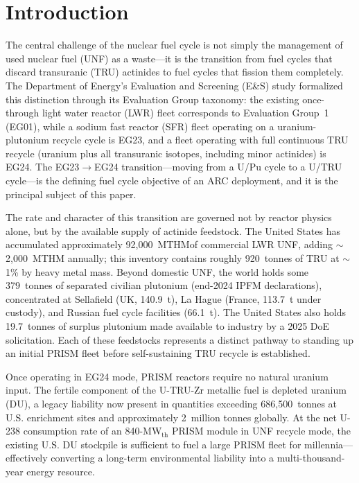 \documentclass[10pt,twoside]{article}
\begin{document}
\section{Introduction}

The central challenge of the nuclear fuel cycle is not simply the management
of used nuclear fuel (UNF) as a waste---it is the transition from fuel cycles that
discard transuranic (TRU) actinides to fuel cycles that fission them completely.
The Department of Energy's Evaluation and Screening (E\&S) study\cite{DOE_ES_2014}
formalized this distinction through its Evaluation Group taxonomy: the existing
once-through light water reactor (LWR) fleet corresponds to Evaluation Group~1
(EG01), while a sodium fast reactor (SFR) fleet operating on a uranium-plutonium
recycle cycle is EG23, and a fleet operating with full continuous TRU recycle
(uranium plus all transuranic isotopes, including minor actinides) is EG24.
The EG23$\rightarrow$EG24 transition---moving from a U/Pu cycle to a U/TRU
cycle---is the defining fuel cycle objective of an ARC deployment, and it is the
principal subject of this paper.

The rate and character of this transition are governed not by reactor physics
alone, but by the available supply of actinide feedstock.  The United States has
accumulated approximately 92{,}000~MTHM\@ of commercial LWR UNF,
adding $\sim$2{,}000~MTHM annually; this inventory contains roughly
920~tonnes of TRU
at $\sim$1\% by heavy metal mass.  Beyond domestic UNF, the world holds
some 379~tonnes of separated civilian plutonium (end-2024 IPFM declarations),
concentrated at Sellafield (UK, 140.9~t), La Hague (France, 113.7~t
under custody), and Russian fuel cycle facilities (66.1~t).\cite{IPFM2024}
The United States also holds 19.7~tonnes of surplus plutonium made
available to industry by a 2025 DoE solicitation.\cite{DOE_Pu_FOA_2025}
Each of these feedstocks represents a distinct pathway to standing up
an initial PRISM fleet before self-sustaining TRU recycle is established.

Once operating in EG24 mode, PRISM reactors require no natural uranium input.
The fertile component of the U-TRU-Zr metallic fuel is depleted uranium (DU),
a legacy liability now present in quantities exceeding 686{,}500~tonnes at
U.S. enrichment sites and approximately 2~million tonnes globally.\cite{WNA_DU}
At the net U-238 consumption rate of an 840-MW$_\text{th}$ PRISM module
in UNF recycle mode, the existing U.S. DU stockpile is sufficient to fuel
a large PRISM fleet for millennia---effectively converting a long-term
environmental liability into a multi-thousand-year energy resource.
\end{document}
